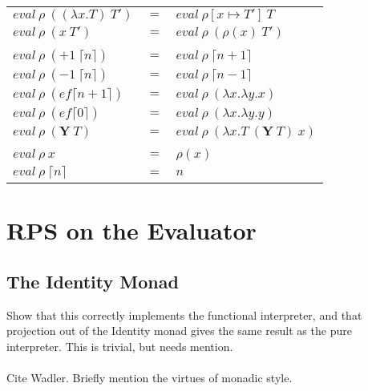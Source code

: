 \documentclass{article}
\newcommand{\Y}[0]{\textbf{Y}}
\begin{document}
\begin{tabular}[t]{lll}
$eval\ \rho\ ((\lambda x . T)\ T\prime)$ &$=$& $eval\ \rho[x \mapsto T\prime]\ T$\\
$eval\ \rho\ (x\ T\prime)$ &$=$& $eval\ \rho\ (\rho(x)\ T\prime)$\\
\\
$eval\ \rho\ (+1\ \lceil n \rceil)$ &$=$& $eval\ \rho\ \lceil n + 1 \rceil$\\
$eval\ \rho\ (-1\ \lceil n \rceil)$ &$=$& $eval\ \rho\ \lceil n - 1 \rceil$\\
$eval\ \rho\ (ef \lceil n + 1 \rceil)$ &$=$& $eval\ \rho\ (\lambda x . \lambda y. x)$\\
$eval\ \rho\ (ef \lceil 0 \rceil)$ &$=$& $eval\ \rho\ (\lambda x . \lambda y. y)$\\
$eval\ \rho\ (\Y\ T)$ &$=$& $eval\ \rho\ (\lambda x . T\ (\Y\ T)\ x)$\\
\\
$eval\ \rho\ x$ &$=$& $\rho(x)$\\
$eval\ \rho\ \lceil n \rceil$ &$=$& $ n $\\

\end{tabular}

\section{RPS on the Evaluator}

\subsection{The Identity Monad}

Show that this correctly implements the functional interpreter, and that projection out of the Identity monad gives the same result as the pure interpreter.  This is trivial, but needs mention.\\
\\
Cite Wadler.  Briefly mention the virtues of monadic style.
\end{document}
